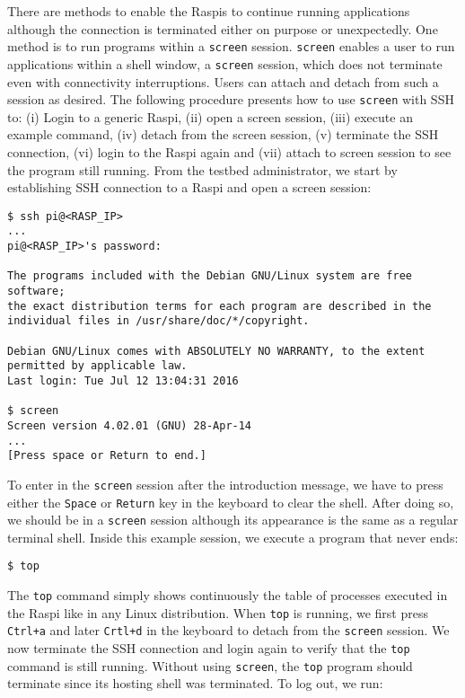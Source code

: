 There are methods to enable the \ac{Raspi}s to continue running
applications although the connection is terminated either on purpose or
unexpectedly. One method is to run programs within a \texttt{screen} session.
\texttt{screen} enables a user to run applications within a shell
window, a \texttt{screen} session, which does not terminate even with
connectivity interruptions. Users can attach and detach from such a session
as desired. The following procedure presents how to use \texttt{screen} with
\ac{SSH} to: (i) Login to a generic \ac{Raspi}, (ii) open a screen session,
(iii) execute an example command, (iv) detach from the screen session, (v)
terminate the \ac{SSH} connection, (vi) login to the \ac{Raspi} again
and (vii) attach to screen session to see the program still running.
From the testbed administrator, we start by establishing \ac{SSH} connection
to a \ac{Raspi} and open a screen session:

\begin{lstlisting}[]
$ ssh pi@<RASP_IP>
...
pi@<RASP_IP>'s password:

The programs included with the Debian GNU/Linux system are free software;
the exact distribution terms for each program are described in the
individual files in /usr/share/doc/*/copyright.

Debian GNU/Linux comes with ABSOLUTELY NO WARRANTY, to the extent
permitted by applicable law.
Last login: Tue Jul 12 13:04:31 2016

$ screen
Screen version 4.02.01 (GNU) 28-Apr-14
...
[Press space or Return to end.]
\end{lstlisting}
\FloatBarrier
\vspace{-5mm}

To enter in the \texttt{screen} session after the introduction message, we
have to press either the \texttt{Space} or \texttt{Return} key in the
keyboard to clear the shell. After doing so, we should be in a
\texttt{screen} session although its appearance is the same as a regular
terminal shell. Inside this example session, we execute a program that
never ends:

\begin{lstlisting}[]
$ top
\end{lstlisting}
\FloatBarrier
\vspace{-5mm}

The \texttt{top} command simply shows continuously the table of processes
executed in the \ac{Raspi} like in any Linux distribution. When \texttt{top}
is running, we first press \texttt{Ctrl+a} and later \texttt{Crtl+d}
in the keyboard to detach from the \texttt{screen} session. We now
terminate the \ac{SSH} connection and login again to verify that the
\texttt{top} command is still running. Without using \texttt{screen},
the \texttt{top} program should terminate since its hosting shell was
terminated. To log out, we run:

